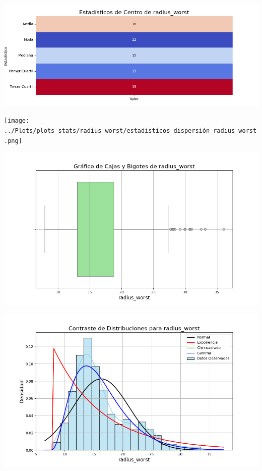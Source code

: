 \documentclass[a4paper, 12pt]{article}
\begin{document}
\includegraphics[width=\textwidth]{../Plots/plots_stats/radius_worst/estadisticas_centro_radius_worst.png}




\texttt{[image: ../Plots/plots\_stats/radius\_worst/estadisticos\_dispersión\_radius\_worst.png]}



\includegraphics[width=\textwidth]{../Plots/plots_stats/radius_worst/boxplot_radius_worst.png}




\includegraphics[width=\textwidth]{../Plots/plots_stats/radius_worst/distribuciones_conocidas_radius_worst.png}
\end{document}
